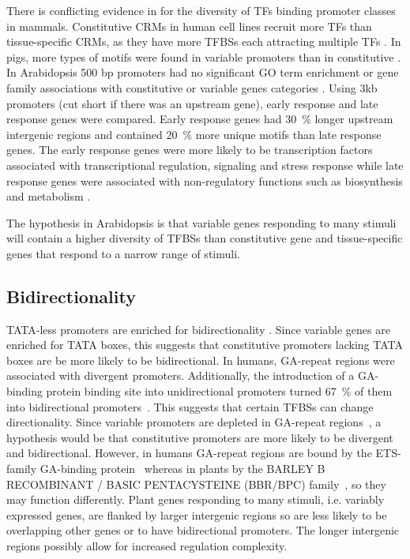 \documentclass[../main.tex]{subfiles}
\begin{document}
\label{chapter1:introduction:tf-diversity}
There is conflicting evidence in for the diversity of TFs binding promoter classes in mammals.
Constitutive CRMs in human cell lines recruit more TFs than tissue-specific CRMs, as they have more TFBSs each attracting multiple TFs \autocite{mattioliHighthroughputFunctionalAnalysis2019}.
In pigs, more types of motifs were found in variable promoters than in constitutive \autocite{weiCharacterizationGenePromoters2019}.
In Arabidopsis 500 bp promoters had no significant GO term enrichment or gene family associations with constitutive or variable genes categories \autocite{waltherRegulatoryCodeTranscriptional2007}.
Using 3kb promoters (cut short if there was an upstream gene), early response and late response genes were compared.
Early response genes had \SI{30}{\percent} longer upstream intergenic regions and contained \SI{20}{\percent} more unique motifs than late response genes.
The early response genes were more likely to be transcription factors associated with transcriptional regulation, signaling and stress response while late response genes were associated with non-regulatory functions such as biosynthesis and metabolism {\autocite{waltherRegulatoryCodeTranscriptional2007}}.

The hypothesis in Arabidopsis is that variable genes responding to many stimuli will contain a higher diversity of TFBSs than constitutive gene and tissue-specific genes that respond to a narrow range of stimuli.

\subsection{Bidirectionality}

TATA-less promoters are enriched for bidirectionality \autocite{dhadiGenomewideComparativeAnalysis2009}.
Since variable genes are enriched for TATA boxes, this suggests that constitutive promoters lacking TATA boxes are be more likely to be bidirectional.
In humans, GA\hyp{}repeat regions were associated with divergent promoters. Additionally, the introduction of a GA\hyp{}binding protein binding site into unidirectional promoters turned \SI{67}{\percent} of them into bidirectional promoters~\autocite{collinsEtsRelatedTranscriptionFactor2007}.
This suggests that certain TFBSs can change directionality.
Since variable promoters are depleted in GA\hyp{}repeat regions~\autocite{yamamotoHeterogeneityArabidopsisCore2009}, a hypothesis would be that constitutive promoters are more likely to be divergent and bidirectional.
However, in humans GA\hyp{}repeat regions are bound by the ETS\hyp{}family GA\hyp{}binding protein~\autocite{collinsEtsRelatedTranscriptionFactor2007} whereas in plants by the BARLEY B RECOMBINANT / BASIC PENTACYSTEINE (BBR/BPC) family~\autocite{theunePhylogeneticAnalysesGAGAMotif2019}, so they may function differently.
Plant genes responding to many stimuli, i.e. variably expressed genes, are flanked by larger intergenic regions \autocite{waltherRegulatoryCodeTranscriptional2007} so are less likely to be overlapping other genes or to have bidirectional promoters.
The longer intergenic regions possibly allow for increased regulation complexity.
\end{document}
